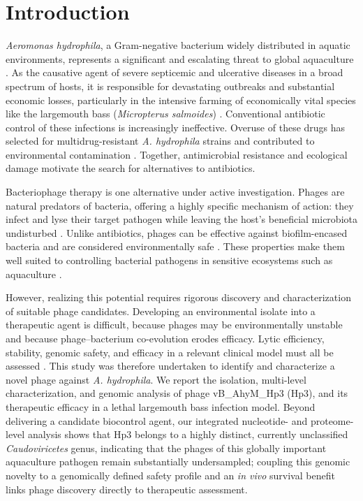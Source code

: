     

\section{Introduction}\label{introduction}

\emph{Aeromonas hydrophila}, a Gram-negative bacterium widely
distributed in aquatic environments, represents a significant and
escalating threat to global aquaculture \citep{2023-Review_Semwal}. As
the causative agent of severe septicemic and ulcerative diseases in a
broad spectrum of hosts, it is responsible for devastating outbreaks and
substantial economic losses, particularly in the intensive farming of
economically vital species like the largemouth bass (\emph{Micropterus
salmoides})
\citep{2006-Importance_Daskalov, 2021-MiRNAseq_Zhou, 2025-Vivo_Wang}.
Conventional antibiotic control of these
infections is increasingly ineffective. Overuse of these drugs
has selected for multidrug-resistant \emph{A.
hydrophila} strains and contributed
to environmental contamination \citep{2025-Global_Jeamsripong}. Together,
antimicrobial resistance and ecological damage motivate the search for
alternatives to antibiotics.

Bacteriophage therapy is one alternative under active investigation.
Phages are natural predators of bacteria, offering a highly
specific mechanism of action: they infect and lyse their target pathogen
while leaving the host's beneficial microbiota undisturbed
\citep{2019-Phage_GordilloAltamirano}. Unlike antibiotics, phages can be
effective against biofilm-encased bacteria and are considered
environmentally safe \citep{2023-Potential_Guo}. These properties make
them well suited to controlling bacterial pathogens
in sensitive ecosystems such as aquaculture \citep{2021-Phage_Ramos-Vivas}.

However, realizing this potential requires rigorous discovery and
characterization of suitable phage candidates.
Developing an environmental isolate into a therapeutic agent is
difficult, because phages may be environmentally unstable and because
phage--bacterium co-evolution erodes efficacy. Lytic efficiency,
stability, genomic safety, and efficacy in a relevant clinical model
must all be assessed
\citep{2025-Reevaluating_Cook, 2018-Phage_Torres-Barcelo}. This study
was therefore undertaken to identify and characterize a
novel phage against \emph{A. hydrophila}. We report the isolation,
multi-level characterization, and genomic analysis of phage
vB\_AhyM\_Hp3 (Hp3), and its
therapeutic efficacy in a lethal largemouth bass infection model.
Beyond delivering a candidate biocontrol agent, our integrated
nucleotide- and proteome-level analysis shows that Hp3 belongs to a
highly distinct, currently unclassified \emph{Caudoviricetes} genus,
indicating that the phages of this globally important aquaculture
pathogen remain substantially undersampled; coupling this genomic
novelty to a genomically defined safety profile and an \emph{in vivo}
survival benefit links phage discovery directly to therapeutic
assessment.

